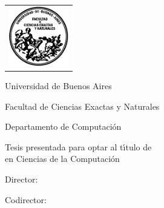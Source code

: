\newcommand{\HRule}{\rule{\linewidth}{0.2mm}}
%
\thispagestyle{empty}

\begin{center}\leavevmode

\vspace{-2cm}

\begin{tabular}{l}
\includegraphics[width=2.6cm]{logofcen.pdf}
\end{tabular}


{\large \sc Universidad de Buenos Aires

Facultad de Ciencias Exactas y Naturales

Departamento de Computaci\'on}

\vspace{6.0cm}


{\huge\bf \tituloTesis}

\vspace{2cm}

{\large Tesis presentada para optar al t\'{\i}tulo de\\
\titulo en Ciencias de la Computaci\'on}

\vspace{2cm}

{\Large \autor}

\end{center}

\vfill

{\large

{Director: \director}

\vspace{.2cm}

{Codirector: \codirector}

\vspace{.2cm}

\lugar
}

\newpage\thispagestyle{empty}

